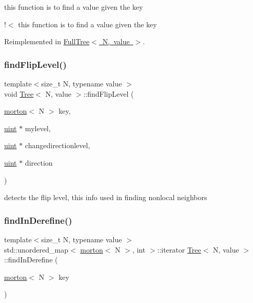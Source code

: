 this function is to find a value given the key

!$<$ this function is to find a value given the key 

Reimplemented in \mbox{\hyperlink{classFullTree_ad0432afb277be83e79d33e1a748648a3}{Full\+Tree$<$ N, value $>$}}.

\mbox{\label{classTree_a272d3af67b3ab350755281bba8d4e18c}} 
\subsubsection{\texorpdfstring{find\+Flip\+Level()}{findFlipLevel()}}
{\footnotesize\ttfamily template$<$size\+\_\+t N, typename value $>$ \\
void \mbox{\hyperlink{classTree}{Tree}}$<$ N, value $>$\+::find\+Flip\+Level (\begin{DoxyParamCaption}\item[{\mbox{\hyperlink{definitions_8h_af8682350bd8bb38ee9023f7a0a310add}{morton}}$<$ N $>$}]{key,  }\item[{\mbox{\hyperlink{definitions_8h_a69aa29b598b851b0640aa225a9e5d61d}{uint}} $\ast$}]{mylevel,  }\item[{\mbox{\hyperlink{definitions_8h_a69aa29b598b851b0640aa225a9e5d61d}{uint}} $\ast$}]{changedirectionlevel,  }\item[{\mbox{\hyperlink{definitions_8h_a69aa29b598b851b0640aa225a9e5d61d}{uint}} $\ast$}]{direction }\end{DoxyParamCaption})}

detects the flip level, this info used in finding nonlocal neighbors \mbox{\label{classTree_a7844a0ee00798d6058e7a741cfe0e85b}} 
\subsubsection{\texorpdfstring{find\+In\+Derefine()}{findInDerefine()}}
{\footnotesize\ttfamily template$<$size\+\_\+t N, typename value $>$ \\
std\+::unordered\+\_\+map$<$ \mbox{\hyperlink{definitions_8h_af8682350bd8bb38ee9023f7a0a310add}{morton}}$<$ N $>$, int $>$\+::iterator \mbox{\hyperlink{classTree}{Tree}}$<$ N, value $>$\+::find\+In\+Derefine (\begin{DoxyParamCaption}\item[{\mbox{\hyperlink{definitions_8h_af8682350bd8bb38ee9023f7a0a310add}{morton}}$<$ N $>$}]{key }\end{DoxyParamCaption})}

